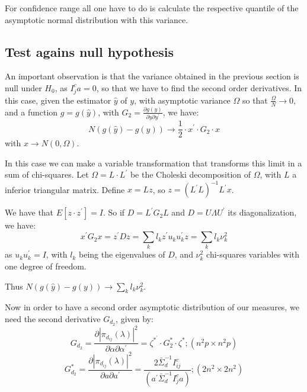 \documentclass[a4paper,10pt]{article}
\begin{document}
For confidence range all one have to do is calculate the respective quantile of the asymptotic normal distribution with this variance.

\subsection{Test agains null hypothesis}

An important observation is that the variance obtained in the previous section is null under $H_0$, as $I_{j}^{c} a = 0$, so that we have to find the second order derivatives. In this case, given the estimator $\hat{y}$ of $y$, with asymptotic variance $\Omega$ so that $\frac{\Omega}{N} \to 0$, and a function $g = g(\hat{y})$, with $G_2 = \frac{\partial g(y)}{\partial y \partial y^{'}}$, we have:
\begin{equation}
N (g(\hat{y}) - g(y)) \to \frac{1}{2} \cdot x^{'} \cdot G_2 \cdot x
\end{equation}
with $x \to N(0, \Omega)$.

In this case we can make a variable transformation that transforms this limit in a sum of chi-squares. Let $\Omega = L \cdot L^{'}$ be the Choleski decomposition of $\Omega$, with $L$ a inferior triangular matrix. Define $x = Lz$, so $z = (L^{'}L)^{-1} L^{'} x$.

We have that $E[z \cdot z^{'}] = I$. So if $D = L^{'} G_2 L$ and $D = U \Lambda U^{'}$ its diagonalization, we have:
\begin{equation}
x^{'} G_{2} x = z^{'} D z = \sum_{k} {l_{k} z^{'} u_{k} u_{k}^{'} z} = \sum_{k} {l_{k} \nu_{k}^{2}}
\end{equation}
as $u_{k} u_{k}^{'} = I$, with $l_{k}$ being the eigenvalues of $D$, and $\nu_{k}^{2}$ chi-squares variables with one degree of freedom.

Thus $N (g(\hat{y}) - g(y)) \to \sum_{k} {l_{k} \nu_{k}^{2}}$.

Now in order to have a second order asymptotic distribution of our measures, we need the second derivative $G_{d_2}$, given by:
\begin{equation}
G_{d_2} = \frac{\partial |\pi_{d_{ij}}(\lambda)|^{2}}{\partial \alpha \partial \alpha^{'}} = \zeta^{\ast^{'}} \cdot G_{2}^{\ast} \cdot \zeta^{\ast}; (n^{2}p \times n^{2}p)
\end{equation}
\begin{equation}
G_{d_2}^{\ast} = \frac{\partial |\pi_{d_{ij}}(\lambda)|^{2}}{\partial a \partial a^{'}} = \frac{2 \bar{\Sigma}_{d}^{-1} I_{ij}^{c}}{(a^{'} \bar{\Sigma}_{d}^{-1} I_{j}^{c} a)}; (2n^{2} \times 2n^{2})
\end{equation}
\end{document}
